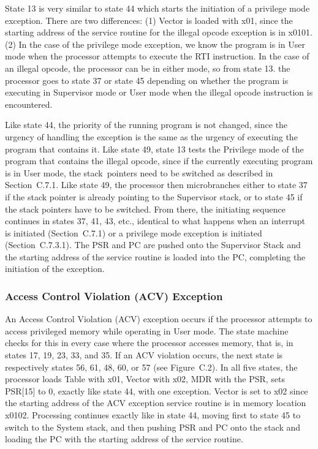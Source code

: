 \documentclass{patt}
\begin{document}
State 13 is very similar to state 44 which starts the initiation of a 
privilege mode exception.  There are two differences: (1) Vector is loaded with 
x01, since the starting address of the service routine for the illegal opcode
exception is in x0101.  (2) In the case of the privilege mode exception, we 
know the program is in User mode when the processor attempts to execute the 
RTI instruction.  In the case of an illegal opcode, the processor can be in 
either mode, so from state 13. the processor goes to state 37 or state 45 
depending on whether the program is executing in Supervisor mode or User mode 
when the illegal opcode instruction is encountered.  

Like state 44, the priority of the running program is not changed, since the 
urgency of handling the exception is the same as the urgency of executing 
the program that contains it.  Like state 49, state 13 tests the Privilege 
mode of the program that contains the illegal opcode, since if the currently 
executing program is in User mode, the stack~pointers need to be switched as 
described in Section~C.7.1.  Like state 49, the processor then 
microbranches either to state 37 if the stack pointer is already pointing to 
the Supervisor stack, or to state 45 if the stack pointers have to be
switched.  From there, the initiating sequence continues in states
37, 41, 43, etc., identical to what happens when an interrupt is
initiated (Section~C.7.1) or a privilege mode exception is
initiated (Section~C.7.3.1).  The PSR and PC are pushed onto the
Supervisor Stack and the starting address of the service routine
is loaded into the PC, completing the initiation of the exception.

\subsubsection{Access Control Violation (ACV) Exception}

An Access Control Violation (ACV) exception occurs if the processor attempts
to access privileged memory while operating in User mode.  The state machine
checks for this in every case where the processor accesses memory, that is,
in states 17, 19, 23, 33, and 35.  If an ACV violation occurs, the next state
is respectively states 56, 61, 48, 60, or 57 (see Figure~C.2).  In all five
states, the processor loads Table with x01, Vector with x02, MDR with the PSR,
sets PSR[15] to 0, exactly like state 44, with one exception.  Vector is set
to x02 since the starting address of the ACV exception service routine is in
memory location x0102.  Processing continues exactly like in state 44, moving
first to state 45 to switch to the System stack, and then pushing PSR and PC 
onto the stack and loading the PC with the starting address of the service 
routine.
\end{document}
